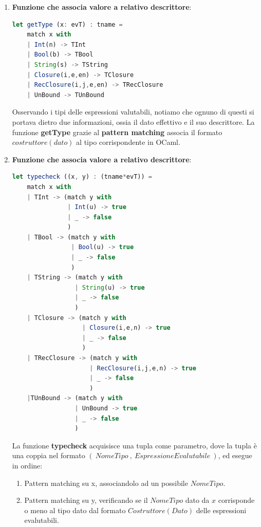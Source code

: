 \documentclass{article}
\begin{document}
\begin{enumerate}
    \item \textbf{Funzione che associa valore a relativo descrittore}:
    \vspace*{10px}
\begin{lstlisting}[language = JavaScript]
    let getType (x: evT) : tname =
    match x with
    | Int(n) -> TInt
    | Bool(b) -> TBool
    | String(s) -> TString
    | Closure(i,e,en) -> TClosure
    | RecClosure(i,j,e,en) -> TRecClosure
    | UnBound -> TUnBound
\end{lstlisting}
\vspace*{-20px}

Osservando i tipi delle espressioni valutabili, notiamo che ognuno di questi si portava dietro due informazioni, ossia il dato effettivo e il suo descrittore. La funzione \textbf{getType} grazie al \textbf{pattern matching} associa il formato $costruttore(dato)$ al tipo corrispondente in OCaml.

    \item \textbf{Funzione che associa valore a relativo descrittore}:
    \vspace*{10px}
\begin{lstlisting}[language = JavaScript]
    let typecheck ((x, y) : (tname*evT)) = 
    match x with
    | TInt -> (match y with 
               | Int(u) -> true
               | _ -> false
               )
    | TBool -> (match y with 
                | Bool(u) -> true
                | _ -> false
                )
    | TString -> (match y with
                 | String(u) -> true
                 | _ -> false
                 )
    | TClosure -> (match y with
                   | Closure(i,e,n) -> true
                   | _ -> false
                   )
    | TRecClosure -> (match y with
                     | RecClosure(i,j,e,n) -> true
                     | _ -> false
                     )
    |TUnBound -> (match y with
                 | UnBound -> true
                 | _ -> false
                 )
\end{lstlisting}
\vspace*{-20px}

La funzione \textbf{typecheck} acquisisce una tupla come parametro, dove la tupla è una coppia nel formato $ (\: NomeTipo \: , \: EspressioneEvalutabile \:) $, ed esegue in ordine:

\begin{enumerate}
    \item Pattern matching su x, associandolo ad un possibile $NomeTipo$.
    \item Pattern matching su y, verificando se il $NomeTipo$ dato da $x$
    corrisponde o meno al tipo dato dal formato $Costruttore(Dato)$ delle espressioni evalutabili.
\end{enumerate}

\end{enumerate}
\end{document}
